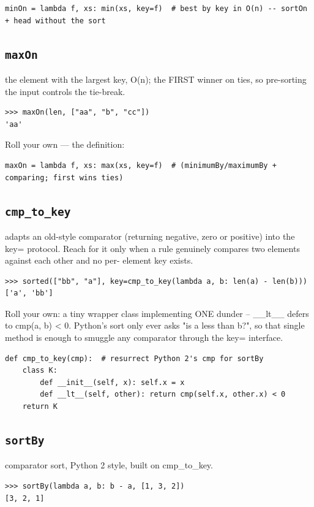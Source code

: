 \documentclass[10pt,letterpaper]{book}
\begin{document}
\begin{lstlisting}[style=ex]
minOn = lambda f, xs: min(xs, key=f)  # best by key in O(n) -- sortOn + head without the sort
\end{lstlisting}
\subsection{\texttt{maxOn}}\label{def:maxOn}
the element with the largest key, O(n); the FIRST winner on ties, so pre-sorting the input controls the tie-break.
\begin{lstlisting}[style=ex]
>>> maxOn(len, ["aa", "b", "cc"])
'aa'
\end{lstlisting}

Roll your own --- the definition:

\begin{lstlisting}[style=ex]
maxOn = lambda f, xs: max(xs, key=f)  # (minimumBy/maximumBy + comparing; first wins ties)
\end{lstlisting}
\subsection{\texttt{cmp\_to\_key}}\label{def:cmp-to-key}
adapts an old-style comparator (returning negative, zero or positive) into the key= protocol. Reach for it only when a rule genuinely compares two elements against each other and no per- element key exists.
\begin{lstlisting}[style=ex]
>>> sorted(["bb", "a"], key=cmp_to_key(lambda a, b: len(a) - len(b)))
['a', 'bb']
\end{lstlisting}

Roll your own: a tiny wrapper class implementing ONE dunder -- \_\_lt\_\_ defers to cmp(a, b) < 0. Python's sort only ever asks "is a less than b?", so that single method is enough to smuggle any comparator through the key= interface.

\begin{lstlisting}[style=ex]
def cmp_to_key(cmp):  # resurrect Python 2's cmp for sortBy
    class K:
        def __init__(self, x): self.x = x
        def __lt__(self, other): return cmp(self.x, other.x) < 0
    return K
\end{lstlisting}

\subsection{\texttt{sortBy}}\label{def:sortBy}
comparator sort, Python 2 style, built on cmp\_to\_key.
\begin{lstlisting}[style=ex]
>>> sortBy(lambda a, b: b - a, [1, 3, 2])
[3, 2, 1]
\end{lstlisting}
\end{document}
